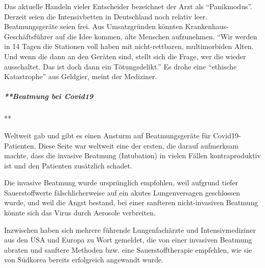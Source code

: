 Das aktuelle Handeln vieler Entscheider bezeichnet der Arzt als
``Panikmodus''. Derzeit seien die Intensivbetten in Deutschland noch
relativ leer. Beatmungsgeräte seien frei. Aus Umsatz­gründen könnten
Krankenhaus-Geschäftsführer auf die Idee kommen, alte Menschen
aufzunehmen. ``Wir werden in 14 Tagen die Stationen voll haben mit
nicht-rettbaren, multimorbiden Alten. Und wenn die dann an den Geräten
sind, stellt sich die Frage, wer die wieder ausschaltet. Das ist doch
dann ein Tötungsdelikt.'' Es drohe eine ``ethische Katastrophe'' aus
Geldgier, meint der Mediziner.

\hypertarget{beatmung-bei-covid19-1}{%
\subparagraph{**Beatmung bei Covid19}\label{beatmung-bei-covid19-1}}

**

Weltweit gab und gibt es einen Ansturm auf Beatmungsgeräte für
Covid19-Patienten. Diese Seite war weltweit eine der ersten, die darauf
aufmerksam machte, dass die invasive Beatmung (Intubation) in vielen
Fällen kontraproduktiv ist und den Patienten zusätzlich schadet.

Die invasive Beatmung wurde ursprünglich empfohlen, weil aufgrund tiefer
Sauerstoffwerte fälschlicherweise auf ein akutes Lungenversagen
geschlossen wurde, und weil die Angst bestand, bei einer sanfteren
nicht-invasiven Beatmung könnte sich das Virus durch Aerosole
verbreiten.

Inzwischen haben sich mehrere führende Lungenfachärzte und
Intensivmediziner aus den USA und Europa zu Wort gemeldet, die von einer
invasiven Beatmung abraten und sanftere Methoden bzw. eine
Sauerstofftherapie empfehlen, wie sie von Südkorea bereits erfolgreich
angewandt wurde.

